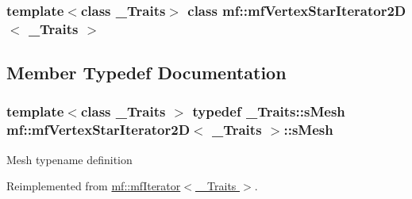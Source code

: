 \subsubsection*{template$<$class \_\-Traits$>$ class mf::mfVertexStarIterator2D$<$ \_\-Traits $>$}



\subsection{Member Typedef Documentation}
\hypertarget{classmf_1_1mfVertexStarIterator2D_a25f97b24c35482b8677e4672d70687cf}{
\subsubsection[{sMesh}]{\setlength{\rightskip}{0pt plus 5cm}template$<$class \_\-Traits $>$ typedef \_\-Traits::sMesh {\bf mf::mfVertexStarIterator2D}$<$ \_\-Traits $>$::{\bf sMesh}}}
\label{classmf_1_1mfVertexStarIterator2D_a25f97b24c35482b8677e4672d70687cf}
Mesh typename definition 

Reimplemented from \hyperlink{classmf_1_1mfIterator_aca31e4d7e7eca4e3b100530d8725064b}{mf::mfIterator$<$ \_\-Traits $>$}.



